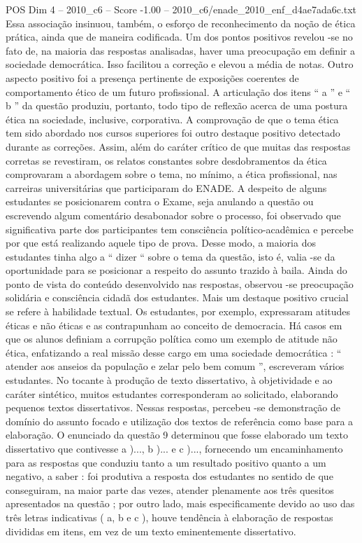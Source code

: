 \begin{textsample}{POS Dim 4 – 2010\_c6 – Score -1.00 – 2010\_c6/enade\_2010\_enf\_d4ae7ada6c.txt}
Essa associação insinuou, também, o esforço de reconhecimento da noção de ética prática, ainda que de maneira codificada.
Um dos pontos positivos revelou -se no fato de, na maioria das respostas analisadas, haver uma preocupação em definir a sociedade democrática.
Isso facilitou a correção e elevou a média de notas.
Outro aspecto positivo foi a presença pertinente de exposições coerentes de comportamento ético de um futuro profissional.
A articulação dos itens “ a ” e “ b ” da questão produziu, portanto, todo tipo de reflexão acerca de uma postura ética na sociedade, inclusive, corporativa.
A comprovação de que o tema ética tem sido abordado nos cursos superiores foi outro destaque positivo detectado durante as correções.
Assim, além do caráter crítico de que muitas das respostas corretas se revestiram, os relatos constantes sobre desdobramentos da ética comprovaram a abordagem sobre o tema, no mínimo, a ética profissional, nas carreiras universitárias que participaram do ENADE.
A despeito de alguns estudantes se posicionarem contra o Exame, seja anulando a questão ou escrevendo algum comentário desabonador sobre o processo, foi observado que significativa parte dos participantes tem consciência político-acadêmica e percebe por que está realizando aquele tipo de prova.
Desse modo, a maioria dos estudantes tinha algo a “ dizer “ sobre o tema da questão, isto é, valia -se da oportunidade para se posicionar a respeito do assunto trazido à baila.
Ainda do ponto de vista do conteúdo desenvolvido nas respostas, observou -se preocupação solidária e consciência cidadã dos estudantes.
Mais um destaque positivo crucial se refere à habilidade textual.
Os estudantes, por exemplo, expressaram atitudes éticas e não éticas e as contrapunham ao conceito de democracia.
Há casos em que os alunos definiam a corrupção política como um exemplo de atitude não ética, enfatizando a real missão desse cargo em uma sociedade democrática : “ atender aos anseios da população e zelar pelo bem comum ”, escreveram vários estudantes.
No tocante à produção de texto dissertativo, à objetividade e ao caráter sintético, muitos estudantes corresponderam ao solicitado, elaborando pequenos textos dissertativos.
Nessas respostas, percebeu -se demonstração de domínio do assunto focado e utilização dos textos de referência como base para a elaboração.
O enunciado da questão 9 determinou que fosse elaborado um texto dissertativo que contivesse a )..., b )... e c )..., fornecendo um encaminhamento para as respostas que conduziu tanto a um resultado positivo quanto a um negativo, a saber : foi produtiva a resposta dos estudantes no sentido de que conseguiram, na maior parte das vezes, atender plenamente aos três quesitos apresentados na questão ; por outro lado, mais especificamente devido ao uso das três letras indicativas ( a, b e c ), houve tendência à elaboração de respostas divididas em itens, em vez de um texto eminentemente dissertativo.

\end{textsample}
